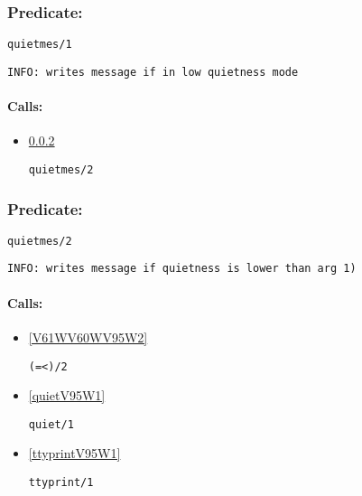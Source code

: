 \subsubsection{Predicate:} \label{quietmesV95W1}

\begin{verbatim}
quietmes/1
\end{verbatim}

{\small \begin{verbatim}
INFO: writes message if in low quietness mode

\end{verbatim}}
\paragraph{Calls:} 
\begin{itemize}
\item \ref{quietmesV95W2} 
\begin{verbatim}
quietmes/2
\end{verbatim}

\end{itemize}

\subsubsection{Predicate:} \label{quietmesV95W2}

\begin{verbatim}
quietmes/2
\end{verbatim}

{\small \begin{verbatim}
INFO: writes message if quietness is lower than arg 1)

\end{verbatim}}
\paragraph{Calls:} 
\begin{itemize}
\item \ref{V61WV60WV95W2} 
\begin{verbatim}
(=<)/2
\end{verbatim}

\item \ref{quietV95W1} 
\begin{verbatim}
quiet/1
\end{verbatim}

\item \ref{ttyprintV95W1} 
\begin{verbatim}
ttyprint/1
\end{verbatim}

\end{itemize}

